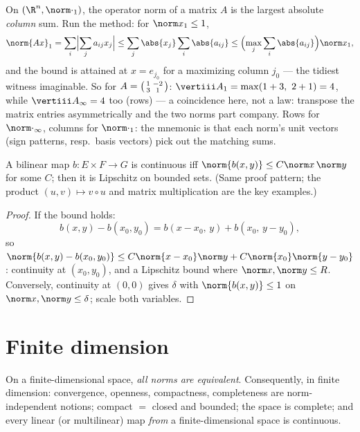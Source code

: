 \begin{example}\label{ex:b2:nvs:columnsums}
On $(\R^n, \norm\cdot_1)$, the operator norm of a matrix $A$ is
the largest absolute \emph{column} sum. Run the method: for
$\norm x_1 \leq 1$,
\[
\norm{Ax}_1 = \sum_i\Bigl|\sum_j a_{ij}x_j\Bigr|
\leq \sum_j \abs{x_j}\sum_i\abs{a_{ij}}
\leq \Bigl(\max_j\sum_i\abs{a_{ij}}\Bigr)\norm x_1 ,
\]
and the bound is attained at $x = e_{j_0}$ for a maximizing
column $j_0$ --- the tidiest witness imaginable. So for $A =
\begin{psmallmatrix}1 & -2\\ 3 & 1\end{psmallmatrix}$:
$\vertiii A_1 = \max(1 + 3,\ 2 + 1) = 4$, while
$\vertiii A_\infty = 4$ too (rows) --- a coincidence here, not
a law: transpose the matrix entries asymmetrically and the two
norms part company. Rows for $\norm\cdot_\infty$, columns for
$\norm\cdot_1$: the mnemonic is that each norm's unit vectors
(sign patterns, resp.\ basis vectors) pick out the matching
sums.
\end{example}

\begin{proposition}\label{prop:b2:nvs:bilinear}
A bilinear map $b \colon E \times F \to G$ is continuous iff
$\norm{b(x,y)} \leq C\norm x\,\norm y$ for some $C$; then it is
Lipschitz on bounded sets. (Same proof pattern; the product
$(u, v) \mapsto v \circ u$ and matrix multiplication are the key
examples.)
\end{proposition}

\begin{proof}
If the bound holds:
\[
b(x,y) - b(x_0,y_0) = b(x - x_0,\, y) + b(x_0,\, y - y_0),
\]
so $\norm{b(x,y) - b(x_0,y_0)} \leq C\norm{x - x_0}\norm y +
C\norm{x_0}\norm{y - y_0}$: continuity at $(x_0, y_0)$, and a
Lipschitz bound where $\norm x, \norm y \leq R$. Conversely,
continuity at $(0,0)$ gives $\delta$ with $\norm{b(x,y)} \leq 1$ on
$\norm x, \norm y \leq \delta$; scale both variables.
\end{proof}

\section{Finite dimension}

\begin{theorem}\label{thm:b2:nvs:finitedim}
On a finite-dimensional space, \emph{all norms are
equivalent}. Consequently, in finite
dimension: convergence, openness, compactness, completeness are
norm-independent notions; compact $=$ closed and bounded;
the space is complete; and every linear (or multilinear) map
\emph{from} a finite-dimensional space is continuous.
\end{theorem}

